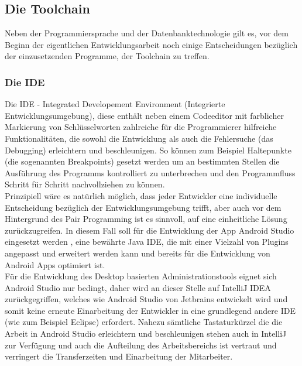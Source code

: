 \subsection{Die Toolchain}

Neben der Programmiersprache und der Datenbanktechnologie gilt es, vor dem Beginn der eigentlichen Entwicklungsarbeit noch einige Entscheidungen bezüglich der einzusetzenden Programme, der Toolchain zu treffen.

\subsubsection{Die IDE}

Die IDE - Integrated Developement Environment (Integrierte Entwicklungsumgebung), diese enthält neben einem Codeeditor mit farblicher Markierung von Schlüsselworten zahlreiche für die Programmierer hilfreiche Funktionalitäten, die sowohl die Entwicklung als auch die Fehlersuche (das Debugging) erleichtern und beschleunigen. So können zum Beispiel Haltepunkte (die sogenannten Breakpoints) gesetzt werden um an bestimmten Stellen die Ausführung des Programms kontrolliert zu unterbrechen und den Programmfluss Schritt für Schritt nachvollziehen zu können.\\

Prinzipiell wäre es natürlich möglich, dass jeder Entwickler eine individuelle Entscheidung bezüglich der Entwicklungsumgebung trifft, aber auch vor dem Hintergrund des Pair Programming ist es sinnvoll, auf eine einheitliche Lösung zurückzugreifen. In diesem Fall soll für die Entwicklung der App Android Studio eingesetzt werden , eine bewährte Java IDE, die mit einer Vielzahl von Plugins angepasst und erweitert werden kann und bereits für die Entwicklung von Android Apps optimiert ist.\\

Für die Entwicklung des Desktop basierten Administrationstools eignet sich Android Studio nur bedingt, daher wird an dieser Stelle auf IntelliJ IDEA zurückgegriffen, welches wie Android Studio von Jetbrains entwickelt wird und somit keine erneute Einarbeitung der Entwickler in eine grundlegend andere IDE (wie zum Beispiel Eclipse) erfordert. Nahezu sämtliche Tastaturkürzel die die Arbeit in Android Studio erleichtern und beschleunigen stehen auch in IntelliJ zur Verfügung und auch die Aufteilung des Arbeitsbereichs ist vertraut und verringert die Transferzeiten und Einarbeitung der Mitarbeiter.\\

